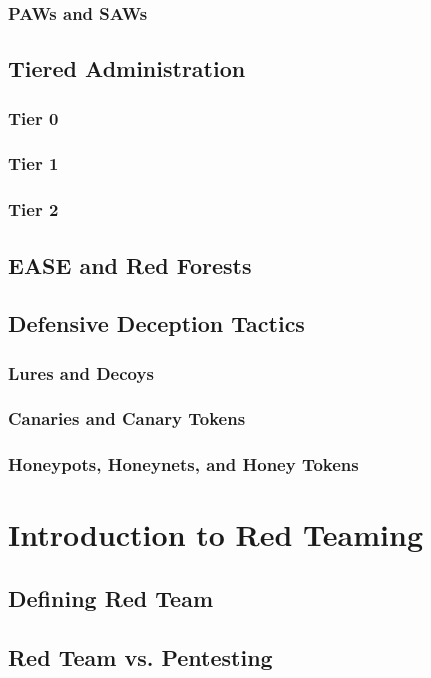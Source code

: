 \documentclass{article}
\begin{document}
\subsubsection{PAWs and SAWs}
\subsection{Tiered Administration}
\subsubsection{Tier 0}
\subsubsection{Tier 1}
\subsubsection{Tier 2}
\subsection{EASE and Red Forests}
\subsection{Defensive Deception Tactics}
\subsubsection{Lures and Decoys}
\subsubsection{Canaries and Canary Tokens}
\subsubsection{Honeypots, Honeynets, and Honey Tokens}

\section{Introduction to Red Teaming}
\subsection{Defining Red Team}
\subsection{Red Team vs. Pentesting}
\end{document}
